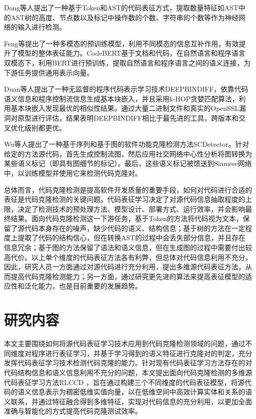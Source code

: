 Dong等人\cite{9148302}提出了一种基于Token和AST的代码表征方式，提取数量特征如AST中的AST树的高度、节点数以及标记中操作数的个数、字符串的个数等作为神经网络的输入进行检测。

Feng等\cite{Feng2020CodeBERTAP}提出了一种多模态的预训练模型，利用不同模态的信息互补作用，有效提升了模型的整体表征能力。CodeBERT基于文档和代码，在自然语言和程序语言双模态下，利用BERT进行预训练，提取自然语言和程序语言之间的语义连接，为下游任务提供通用表示向量。

Duan等人\cite{WOS:000680742600067}提出了一种无监督的程序代码表示学习技术DEEPBINDIFF，依靠代码语义信息和程序控制流信息生成基本块嵌入，并且采用k-HOP贪婪匹配算法，利用基本块嵌入发现最优的相似性结果。通过大量二进制文件和真实的OpenSSL漏洞对原型进行评估，结果表明DEEPBINDIFF相比于最先进的工具，跨版本和交叉优化级别都更优。

Wu等人\cite{10.1145/3324884.3416562}提出了一种基于序列和基于图的软件功能克隆检测方法SCDetector。针对给定的方法源代码，首先生成控制流图，然后应用社交网络中心性分析将图转换为某些语义标记（即具有图细节的标记）。最后，这些语义标记被馈送到Siamese网络中，以训练模型并使用它来检测代码克隆对。

总体而言，代码克隆检测是提高软件开发质量的重要手段，如何对代码进行合适的表征是代码克隆检测的关键问题\cite{JSYJ20240123005}。代码表征学习决定了对源代码信息抽取程度的上限，决定了检测技术的预处理方法、模型设计、部署方式、运行效率，并会影响最终结果。面向代码克隆检测这一下游任务，基于Token的方法将代码视为文本，保留了源代码本身存在的噪声，缺少代码的语义、结构信息；基于树的方法在一定程度上提取了代码的结构信心，但在转换AST的过程中会丢失部分信息，并且存在信息冗余；基于图的方法保留了语法和语义信息，但在生成图的过程中需要付出较高代价。以上单个维度的代码表征方法各有利弊，但总体对代码信息利用不充分，因此，研究人员一方面通过对源代码进行充分利用，提出多维源代码表征方法，从而提高代码克隆检测能力；另一方面，通过研究更先进的算法来提高表征模型的适应性和泛化能力，也是目前重要的发展趋势。

\section{研究内容}
\label{sec:Content}
本文主要围绕如何将源代码表征学习技术应用到代码克隆检测领域的问题，通过不同维度对程序进行表征学习，并基于学习得到的语义特征进行克隆对的判定，充分发挥代码表征学习技术检测代码克隆的能力。针对现有代码表征学习方法存在的对代码结构信息和语义信息利用不充分的问题，本文提出面向代码克隆检测的多维源代码表征学习方法RLCCD ，旨在通过构建三个不同维度的代码表征模型，将源代码的语义信息表示为稠密低维实值向量，以在低维空间中高效计算实体和关系的语义联系，并通过特征融合得到多维特征，实现对代码信息的充分利用，以更加全面准确与智能化的方式提高代码克隆测试效率。

